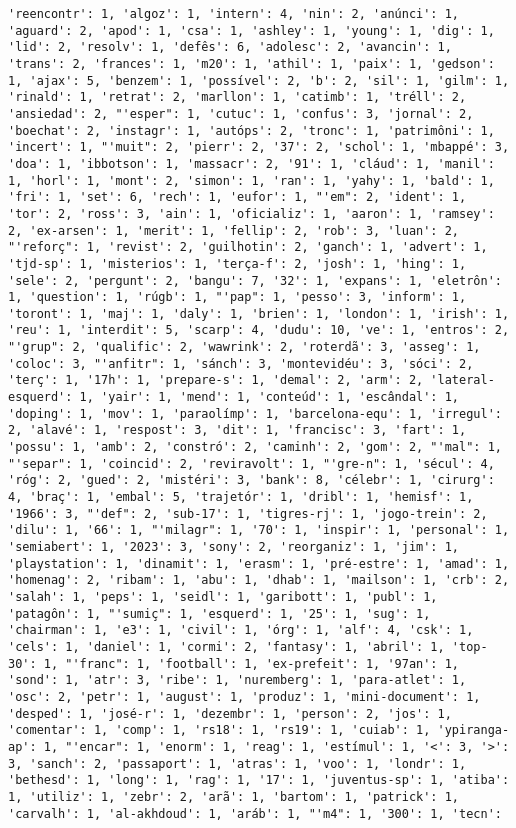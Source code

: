 \documentclass[11pt]{article}
\begin{document}
\begin{Verbatim}[commandchars=\\\{\}]
'reencontr': 1, 'algoz': 1, 'intern': 4, 'nin': 2, 'anúnci': 1, 'aguard': 2, 'apod': 1, 'csa': 1, 'ashley': 1, 'young': 1, 'dig': 1, 'lid': 2, 'resolv': 1, 'defês': 6, 'adolesc': 2, 'avancin': 1, 'trans': 2, 'frances': 1, 'm20': 1, 'athil': 1, 'paix': 1, 'gedson': 1, 'ajax': 5, 'benzem': 1, 'possível': 2, 'b': 2, 'sil': 1, 'gilm': 1, 'rinald': 1, 'retrat': 2, 'marllon': 1, 'catimb': 1, 'tréll': 2, 'ansiedad': 2, "'esper": 1, 'cutuc': 1, 'confus': 3, 'jornal': 2, 'boechat': 2, 'instagr': 1, 'autóps': 2, 'tronc': 1, 'patrimôni': 1, 'incert': 1, "'muit": 2, 'pierr': 2, '37': 2, 'schol': 1, 'mbappé': 3, 'doa': 1, 'ibbotson': 1, 'massacr': 2, '91': 1, 'cláud': 1, 'manil': 1, 'horl': 1, 'mont': 2, 'simon': 1, 'ran': 1, 'yahy': 1, 'bald': 1, 'fri': 1, 'set': 6, 'rech': 1, 'eufor': 1, "'em": 2, 'ident': 1, 'tor': 2, 'ross': 3, 'ain': 1, 'oficializ': 1, 'aaron': 1, 'ramsey': 2, 'ex-arsen': 1, 'merit': 1, 'fellip': 2, 'rob': 3, 'luan': 2, "'reforç": 1, 'revist': 2, 'guilhotin': 2, 'ganch': 1, 'advert': 1, 'tjd-sp': 1, 'misterios': 1, 'terça-f': 2, 'josh': 1, 'hing': 1, 'sele': 2, 'pergunt': 2, 'bangu': 7, '32': 1, 'expans': 1, 'eletrôn': 1, 'question': 1, 'rúgb': 1, "'pap": 1, 'pesso': 3, 'inform': 1, 'toront': 1, 'maj': 1, 'daly': 1, 'brien': 1, 'london': 1, 'irish': 1, 'reu': 1, 'interdit': 5, 'scarp': 4, 'dudu': 10, 've': 1, 'entros': 2, "'grup": 2, 'qualific': 2, 'wawrink': 2, 'roterdã': 3, 'asseg': 1, 'coloc': 3, "'anfitr": 1, 'sánch': 3, 'montevidéu': 3, 'sóci': 2, 'terç': 1, '17h': 1, 'prepare-s': 1, 'demal': 2, 'arm': 2, 'lateral-esquerd': 1, 'yair': 1, 'mend': 1, 'conteúd': 1, 'escândal': 1, 'doping': 1, 'mov': 1, 'paraolímp': 1, 'barcelona-equ': 1, 'irregul': 2, 'alavé': 1, 'respost': 3, 'dit': 1, 'francisc': 3, 'fart': 1, 'possu': 1, 'amb': 2, 'constró': 2, 'caminh': 2, 'gom': 2, "'mal": 1, "'separ": 1, 'coincid': 2, 'reviravolt': 1, "'gre-n": 1, 'sécul': 4, 'róg': 2, 'gued': 2, 'mistéri': 3, 'bank': 8, 'célebr': 1, 'cirurg': 4, 'braç': 1, 'embal': 5, 'trajetór': 1, 'dribl': 1, 'hemisf': 1, '1966': 3, "'def": 2, 'sub-17': 1, 'tigres-rj': 1, 'jogo-trein': 2, 'dilu': 1, '66': 1, "'milagr": 1, '70': 1, 'inspir': 1, 'personal': 1, 'semiabert': 1, '2023': 3, 'sony': 2, 'reorganiz': 1, 'jim': 1, 'playstation': 1, 'dinamit': 1, 'erasm': 1, 'pré-estre': 1, 'amad': 1, 'homenag': 2, 'ribam': 1, 'abu': 1, 'dhab': 1, 'mailson': 1, 'crb': 2, 'salah': 1, 'peps': 1, 'seidl': 1, 'garibott': 1, 'publ': 1, 'patagôn': 1, "'sumiç": 1, 'esquerd': 1, '25': 1, 'sug': 1, 'chairman': 1, 'e3': 1, 'civil': 1, 'órg': 1, 'alf': 4, 'csk': 1, 'cels': 1, 'daniel': 1, 'cormi': 2, 'fantasy': 1, 'abril': 1, 'top-30': 1, "'franc": 1, 'football': 1, 'ex-prefeit': 1, '97an': 1, 'sond': 1, 'atr': 3, 'ribe': 1, 'nuremberg': 1, 'para-atlet': 1, 'osc': 2, 'petr': 1, 'august': 1, 'produz': 1, 'mini-document': 1, 'desped': 1, 'josé-r': 1, 'dezembr': 1, 'person': 2, 'jos': 1, 'comentar': 1, 'comp': 1, 'rs18': 1, 'rs19': 1, 'cuiab': 1, 'ypiranga-ap': 1, "'encar": 1, 'enorm': 1, 'reag': 1, 'estímul': 1, '<': 3, '>': 3, 'sanch': 2, 'passaport': 1, 'atras': 1, 'voo': 1, 'londr': 1, 'bethesd': 1, 'long': 1, 'rag': 1, '17': 1, 'juventus-sp': 1, 'atiba': 1, 'utiliz': 1, 'zebr': 2, 'arã': 1, 'bartom': 1, 'patrick': 1, 'carvalh': 1, 'al-akhdoud': 1, 'aráb': 1, "'m4": 1, '300': 1, 'tecn': 
\end{Verbatim}
\end{document}
